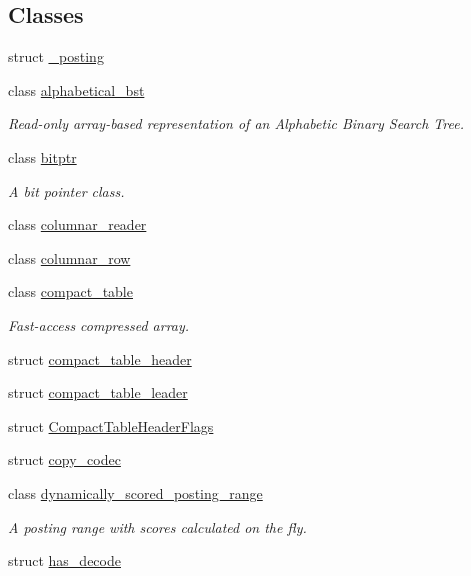 \subsection*{Classes}
\begin{DoxyCompactItemize}
\item 
struct \mbox{\hyperlink{structirk_1_1__posting}{\+\_\+posting}}
\item 
class \mbox{\hyperlink{classirk_1_1alphabetical__bst}{alphabetical\+\_\+bst}}
\begin{DoxyCompactList}\small\item\em Read-\/only array-\/based representation of an Alphabetic Binary Search Tree. \end{DoxyCompactList}\item 
class \mbox{\hyperlink{classirk_1_1bitptr}{bitptr}}
\begin{DoxyCompactList}\small\item\em A bit pointer class. \end{DoxyCompactList}\item 
class \mbox{\hyperlink{classirk_1_1columnar__reader}{columnar\+\_\+reader}}
\item 
class \mbox{\hyperlink{classirk_1_1columnar__row}{columnar\+\_\+row}}
\item 
class \mbox{\hyperlink{classirk_1_1compact__table}{compact\+\_\+table}}
\begin{DoxyCompactList}\small\item\em Fast-\/access compressed array. \end{DoxyCompactList}\item 
struct \mbox{\hyperlink{structirk_1_1compact__table__header}{compact\+\_\+table\+\_\+header}}
\item 
struct \mbox{\hyperlink{structirk_1_1compact__table__leader}{compact\+\_\+table\+\_\+leader}}
\item 
struct \mbox{\hyperlink{structirk_1_1CompactTableHeaderFlags}{Compact\+Table\+Header\+Flags}}
\item 
struct \mbox{\hyperlink{structirk_1_1copy__codec}{copy\+\_\+codec}}
\item 
class \mbox{\hyperlink{classirk_1_1dynamically__scored__posting__range}{dynamically\+\_\+scored\+\_\+posting\+\_\+range}}
\begin{DoxyCompactList}\small\item\em A posting range with scores calculated on the fly. \end{DoxyCompactList}\item 
struct \mbox{\hyperlink{structirk_1_1has__decode}{has\+\_\+decode}}

\end{DoxyCompactItemize}
